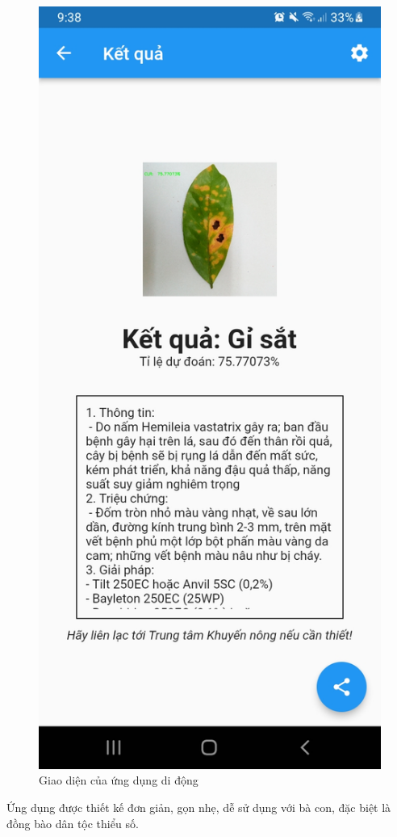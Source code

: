 \documentclass[a4paper,14pt]{extarticle}
\begin{document}
\begin{figure}[H]
		\includegraphics[scale=0.1]{images/screenshot4.jpg}
		\caption{Giao diện của ứng dụng di động}
	\end{figure}

	Ứng dụng được thiết kế đơn giản, gọn nhẹ, dễ sử dụng với bà con, đặc biệt là đồng bào dân tộc thiểu số.
	
\end{document}
